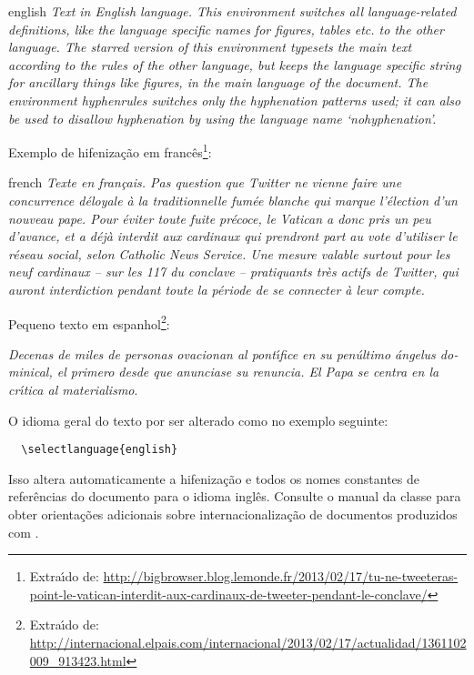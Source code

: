 \begin{otherlanguage*}{english}
\textit{Text in English language. This environment switches all language-related
definitions, like the language specific names for figures, tables etc. to the other
language. The starred version of this environment typesets the main text
according to the rules of the other language, but keeps the language specific
string for ancillary things like figures, in the main language of the document.
The environment hyphenrules switches only the hyphenation patterns used; it can
also be used to disallow hyphenation by using the language name
`nohyphenation'.}
\end{otherlanguage*}

Exemplo de hifeniza\c{c}\~{a}o em franc\^{e}s\footnote{Extra\'{\i}do de:
\url{http://bigbrowser.blog.lemonde.fr/2013/02/17/tu-ne-tweeteras-point-le-vatican-interdit-aux-cardinaux-de-tweeter-pendant-le-conclave/}}:

\begin{otherlanguage*}{french}
\textit{Texte en fran\c{c}ais. Pas question que Twitter ne vienne faire une
concurrence d\'{e}loyale \`{a} la traditionnelle fum\'{e}e blanche qui marque l'\'{e}lection
d'un nouveau pape. Pour \'{e}viter toute fuite pr\'{e}coce, le Vatican a donc pris un
peu d'avance, et a d\'{e}j\`{a} interdit aux cardinaux qui prendront part au vote
d'utiliser le r\'{e}seau social, selon Catholic News Service. Une mesure valable
surtout pour les neuf cardinaux – sur les 117 du conclave – pratiquants tr\`{e}s
actifs de Twitter, qui auront interdiction pendant toute la p\'{e}riode de se
connecter \`{a} leur compte.}
\end{otherlanguage*}

Pequeno texto em espanhol\footnote{Extra\'{\i}do de:
\url{http://internacional.elpais.com/internacional/2013/02/17/actualidad/1361102009_913423.html}}:

\foreignlanguage{spanish}{\textit{Decenas de miles de personas ovacionan al pont\'{\i}fice en su
pen\'{u}ltimo \'{a}ngelus dominical, el primero desde que anunciase su renuncia. El Papa se
centra en la cr\'{\i}tica al materialismo}}.

O idioma geral do texto por ser alterado como no exemplo seguinte:

\begin{verbatim}
  \selectlanguage{english}
\end{verbatim}

Isso altera automaticamente a hifeniza\c{c}\~{a}o e todos os nomes constantes de
refer\^{e}ncias do documento para o idioma ingl\^{e}s. Consulte o manual da classe
\cite{abntex2classe} para obter orienta\c{c}\~{o}es adicionais sobre internacionaliza\c{c}\~{a}o de
documentos produzidos com \abnTeX.

